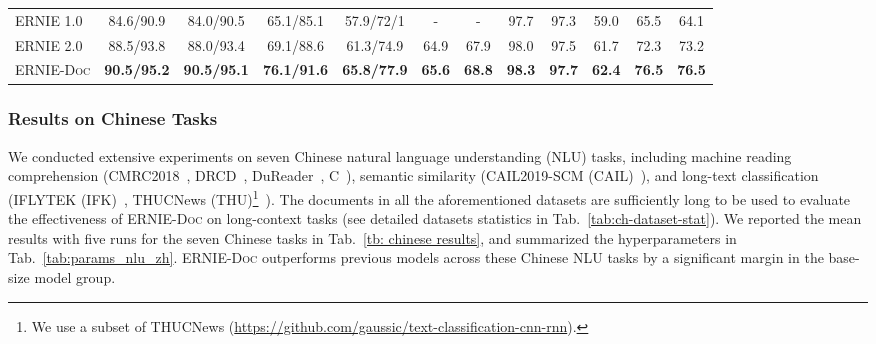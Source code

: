 \documentclass[11pt,a4paper]{article}
\newcommand{\mname}{\textsc{ERNIE-Doc}\xspace}
\begin{document}
\begin{table*}[]
{\begin{tabular}{l|ccccccccccc}
ERNIE 1.0 \citep{sun2019ernie}      & 84.6/90.9                     & 84.0/90.5          & 65.1/85.1          & 57.9/72/1          & -             & -                        & 97.7          & 97.3                     & 59.0             & 65.5           & 64.1           \\
ERNIE 2.0 \citep{sun2020ernie}      & 88.5/93.8                     & 88.0/93.4          & 69.1/88.6          & 61.3/74.9          & 64.9          & 67.9                     & 98.0          & 97.5                     & 61.7             & 72.3           & 73.2           \\ \hline
\mname      & \textbf{90.5/95.2}            & \textbf{90.5/95.1} & \textbf{76.1/91.6} & \textbf{65.8/77.9} & \textbf{65.6} & \textbf{68.8}            & \textbf{98.3} & \textbf{97.7}            & \textbf{62.4}    & \textbf{76.5}  & \textbf{76.5}  \\ \hline
\end{tabular}
}
\caption{Results on seven Chinese NLU tasks for \mname-base model.The results of the models with "" are from \citet{cui2019pre}. The XLNet-zh is the abbreviation of Chinese-XLNet. Notably, the result of BERT on CAIL was obtained from \citet{cail}, where BERT was post-pretrained with a legal dataset.}
\label{tb: chinese results}
\end{table*}

\subsubsection{Results on Chinese Tasks}
We conducted extensive experiments on seven Chinese natural language understanding (NLU) tasks, including machine reading comprehension (CMRC2018~\citep{cmrc2018}, DRCD~\citep{drcd}, DuReader~\citep{dureader}, C~\citep{c3}), semantic similarity (CAIL2019-SCM (CAIL)~\citep{cail}), and long-text classification (IFLYTEK (IFK)~\citep{iflytek}, THUCNews (THU)\footnote{We use a subset of THUCNews (\url{https://github.com/gaussic/text-classification-cnn-rnn}).}~\citep{thucnews}). The documents in all the aforementioned datasets are sufficiently long to be used to evaluate the effectiveness of \mname on long-context tasks (see detailed datasets statistics in Tab.~\ref{tab:ch-dataset-stat}). We reported the mean results with five runs for the seven Chinese tasks in Tab.~\ref{tb: chinese results}, and summarized the hyperparameters in Tab.~\ref{tab:params_nlu_zh}. \mname outperforms previous models across these Chinese NLU tasks by a significant margin in the base-size model group.  
\end{document}
